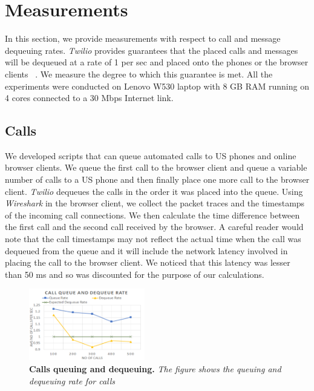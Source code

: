 \section{Measurements}
\label{sec-measurements}

In this section, we provide measurements with respect to call and message dequeuing rates. \textit{Twilio} provides guarantees that the placed calls and messages will be dequeued at a rate of 1 per sec and placed onto the phones or the browser clients ~\cite{guaranteelink}. We measure the degree to which this guarantee is met. All the experiments were conducted on Lenovo W530 laptop with 8 GB RAM running on 4 cores connected to a 30 Mbps Internet link.

\subsection{Calls}
\label{sec-measurements-calls}
We developed scripts that can queue automated calls to US phones and online browser clients. We queue the first call to the browser client and queue a variable number of calls to a US phone and then finally place one more call to the browser client. \textit{Twilio} dequeues the calls in the order it was placed into the queue. Using \textit{Wireshark} in the browser client, we collect the packet traces and the timestamps of the incoming call connections. We then calculate the time difference between the first call and the second call received by the browser. A careful reader would note that the call timestamps may not reflect the actual time when the call was dequeued from the queue and it will include the network latency involved in placing the call to the browser client. We noticed that this latency was lesser than 50 ms and so was discounted for the purpose of our calculations. 

\begin{figure} \centering
\includegraphics[width=0.45\textwidth]{graphs/calls.pdf}
\caption{\textbf{Calls queuing and dequeuing.} {\footnotesize\textit{
The figure shows the queuing and dequeuing rate for calls
}}}
\label{fig:calls}
\end{figure}

